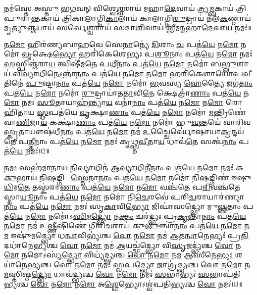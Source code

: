  
𑌨𑌮॑𑌸𑍍𑌤𑍇 𑌅𑌸𑍍𑌤𑍁 𑌭𑌗𑌵𑌨𑍍 𑌵𑌿𑌶𑍍𑌵𑍇\ul{𑌶𑍍𑌵}𑌰𑌾𑌯॑ 𑌮𑌹𑌾\ul{𑌦𑍇}𑌵𑌾𑌯॑ 𑌤𑍍𑌰𑍍𑌯\ul{𑌮𑍍𑌬}𑌕𑌾𑌯॑ 𑌤𑍍𑌰𑌿𑌪𑍁𑌰𑌾\ul{𑌨𑍍𑌤}𑌕𑌾𑌯॑ 𑌤𑍍𑌰𑌿𑌕𑌾𑌲𑌾𑌗𑍍𑌨𑌿\ul{𑌕𑌾}𑌲𑌾𑌯॑ 𑌕𑌾𑌲𑌾𑌗𑍍𑌨𑌿\ul{𑌰𑍁}𑌦𑍍𑌰𑌾𑌯॑ 𑌨𑍀𑌲\ul{𑌕}𑌣𑍍𑌠𑌾𑌯॑ 𑌮𑍃𑌤𑍍𑌯𑍁\ul{𑌞𑍍𑌜}𑌯𑌾𑌯॑ 𑌸𑌰𑍍𑌵𑍇\ul{𑌶𑍍𑌵}𑌰𑌾𑌯॑ 𑌸𑌦𑌾\ul{𑌶𑌿}𑌵𑌾𑌯॑ 𑌶𑍍𑌰𑍀𑌮𑌨𑍍𑌮𑌹𑌾\ul{𑌦𑍇}𑌵𑌾\ul{𑌯} 𑌨𑌮𑌃॑॥ 

𑌨\ul{𑌮𑍋} 𑌹𑌿𑌰॑𑌣𑍍𑌯𑌬𑌾𑌹𑌵𑍇 𑌸𑍇\ul{𑌨𑌾}𑌨𑍍𑌯𑍇॑ \ul{𑌦𑌿}𑌶𑌾𑌂 \ul{𑌚} 𑌪𑌤॑\ul{𑌯𑍇} 𑌨\ul{𑌮𑍋} 𑌨𑌮𑍋॑ \ul{𑌵𑍃}𑌕𑍍𑌷𑍇\ul{𑌭𑍍𑌯𑍋} 𑌹𑌰𑌿॑𑌕𑍇𑌶𑍇𑌭𑍍𑌯𑌃 𑌪\ul{𑌶𑍂}𑌨𑌾𑌂 𑌪𑌤॑\ul{𑌯𑍇} 𑌨\ul{𑌮𑍋} 𑌨𑌮𑌃॑ \ul{𑌸}𑌸𑍍𑌪𑌿𑌞𑍍𑌜॑𑌰𑌾\ul{𑌯} 𑌤𑍍𑌵𑌿𑌷𑍀॑𑌮𑌤𑍇 𑌪\ul{𑌥𑍀}𑌨𑌾𑌂 𑌪𑌤॑\ul{𑌯𑍇} 𑌨\ul{𑌮𑍋} 𑌨𑌮𑍋॑ 𑌬\ul{𑌭𑍍𑌲𑍁}𑌶𑌾𑌯॑ 𑌵𑌿\ul{𑌵𑍍𑌯𑌾}𑌧𑌿𑌨𑍇\-𑌽𑌨𑍍𑌨𑌾॑\ul{𑌨𑌾𑌂} 𑌪𑌤॑\ul{𑌯𑍇} 𑌨\ul{𑌮𑍋} 𑌨\ul{𑌮𑍋} 𑌹𑌰𑌿॑𑌕𑍇𑌶𑌾𑌯𑍋𑌪\ul{𑌵𑍀}𑌤𑌿𑌨𑍇॑ \ul{𑌪𑍁}𑌷𑍍𑌟𑌾\ul{𑌨𑌾𑌂} 𑌪𑌤॑\ul{𑌯𑍇} 𑌨\ul{𑌮𑍋} 𑌨𑌮𑍋॑ \ul{𑌭}𑌵𑌸𑍍𑌯॑ \ul{𑌹𑍇}𑌤𑍍𑌯𑍈 𑌜𑌗॑\ul{𑌤𑌾𑌂} 𑌪𑌤॑\ul{𑌯𑍇} 𑌨\ul{𑌮𑍋} 𑌨𑌮𑍋॑ \ul{𑌰𑍁}𑌦𑍍𑌰𑌾𑌯𑌾॑𑌤\ul{𑌤𑌾}𑌵𑌿\ul{𑌨𑍇} 𑌕𑍍𑌷𑍇𑌤𑍍𑌰𑌾॑\ul{𑌣𑌾𑌂} 𑌪𑌤॑\ul{𑌯𑍇} 𑌨\ul{𑌮𑍋} 𑌨𑌮𑌃॑ \ul{𑌸𑍂}𑌤𑌾𑌯𑌾𑌹॑𑌨𑍍𑌤𑍍𑌯𑌾\ul{𑌯} 𑌵𑌨𑌾॑\ul{𑌨𑌾𑌂} 𑌪𑌤॑\ul{𑌯𑍇} 𑌨\ul{𑌮𑍋} 𑌨\ul{𑌮𑍋} 𑌰𑍋𑌹𑌿॑𑌤𑌾𑌯 \ul{𑌸𑍍𑌥}𑌪𑌤॑𑌯𑍇 \ul{𑌵𑍃}𑌕𑍍𑌷𑌾\ul{𑌣𑌾𑌂} 𑌪𑌤॑\ul{𑌯𑍇} 𑌨\ul{𑌮𑍋} 𑌨𑌮𑍋॑ \ul{𑌮}𑌨𑍍𑌤𑍍𑌰𑌿𑌣𑍇॑ 𑌵𑌾\ul{𑌣𑌿}𑌜𑌾\ul{𑌯} 𑌕𑌕𑍍𑌷𑌾॑\ul{𑌣𑌾𑌂} 𑌪𑌤॑\ul{𑌯𑍇} 𑌨\ul{𑌮𑍋} 𑌨𑌮𑍋॑ 𑌭𑍁\ul{𑌵}𑌨𑍍𑌤𑌯𑍇॑ 𑌵𑌾𑌰𑌿𑌵\ul{𑌸𑍍𑌕𑍃}𑌤𑌾𑌯𑍗𑌷॑𑌧𑍀\ul{𑌨𑌾𑌂} 𑌪𑌤॑\ul{𑌯𑍇} 𑌨\ul{𑌮𑍋} 𑌨𑌮॑ \ul{𑌉}𑌚𑍍𑌚𑍈𑌰𑍍𑌘𑍋॑𑌷𑌾\-𑌯𑌾\ul{𑌕𑍍𑌰}𑌨𑍍𑌦𑌯॑𑌤𑍇 𑌪\ul{𑌤𑍍𑌤𑍀}𑌨𑌾𑌂 𑌪𑌤॑\ul{𑌯𑍇} 𑌨\ul{𑌮𑍋} 𑌨𑌮𑌃॑ 𑌕𑍃𑌥𑍍𑌸𑍍𑌨\ul{𑌵𑍀}𑌤𑌾\ul{𑌯} 𑌧𑌾𑌵॑\ul{𑌤𑍇} 𑌸𑌤𑍍𑌵॑\ul{𑌨𑌾𑌂} 𑌪𑌤॑\ul{𑌯𑍇} 𑌨𑌮𑌃॑॥2॥ 

𑌨\ul{𑌮𑌃} 𑌸𑌹॑𑌮𑌾𑌨𑌾𑌯 𑌨𑌿\ul{𑌵𑍍𑌯𑌾}𑌧𑌿𑌨॑ 𑌆\ul{𑌵𑍍𑌯𑌾}𑌧𑌿𑌨𑍀॑\ul{𑌨𑌾𑌂} 𑌪𑌤॑\ul{𑌯𑍇} 𑌨\ul{𑌮𑍋} 𑌨𑌮𑌃॑ 𑌕\ul{𑌕𑍁}𑌭𑌾𑌯॑ 𑌨𑌿\ul{𑌷}𑌙𑍍𑌗𑌿𑌣𑍇᳚ \ul{𑌸𑍍𑌤𑍇}𑌨𑌾\ul{𑌨𑌾𑌂} 𑌪𑌤॑\ul{𑌯𑍇} 𑌨\ul{𑌮𑍋} 𑌨𑌮𑍋॑ 𑌨𑌿\ul{𑌷}𑌙𑍍𑌗𑌿𑌣॑ 𑌇𑌷𑍁\ul{𑌧𑌿}𑌮\ul{𑌤𑍇} 𑌤𑌸𑍍𑌕॑𑌰𑌾\ul{𑌣𑌾𑌂} 𑌪𑌤॑\ul{𑌯𑍇} 𑌨\ul{𑌮𑍋} 𑌨\ul{𑌮𑍋} 𑌵𑌞𑍍𑌚॑𑌤𑍇 𑌪\ul{𑌰𑌿}𑌵𑌞𑍍𑌚॑𑌤𑍇 𑌸𑍍𑌤𑌾\ul{𑌯𑍂}𑌨𑌾𑌂 𑌪𑌤॑\ul{𑌯𑍇} 𑌨\ul{𑌮𑍋} 𑌨𑌮𑍋॑ 𑌨𑌿\ul{𑌚𑍇}𑌰𑌵𑍇॑ 𑌪𑌰𑌿\ul{𑌚}𑌰𑌾𑌯𑌾𑌰॑𑌣𑍍𑌯𑌾\ul{𑌨𑌾𑌂} 𑌪𑌤॑\ul{𑌯𑍇} 𑌨\ul{𑌮𑍋} 𑌨𑌮𑌃॑ 𑌸𑍃\ul{𑌕𑌾}𑌵𑌿\ul{𑌭𑍍𑌯𑍋} 𑌜𑌿𑌘𑌾॑𑌸𑌦𑍍𑌭𑍍𑌯𑍋 𑌮𑍁\ul{𑌷𑍍𑌣}𑌤𑌾𑌂 𑌪𑌤॑\ul{𑌯𑍇} 𑌨\ul{𑌮𑍋} 𑌨𑌮𑍋॑𑌽\ul{𑌸𑌿}𑌮\ul{𑌦𑍍𑌭𑍍𑌯𑍋} 𑌨\ul{𑌕𑍍𑌤𑌂} 𑌚𑌰॑𑌦𑍍𑌭𑍍𑌯𑌃 𑌪𑍍𑌰\ul{𑌕𑍃}𑌨𑍍𑌤𑌾\ul{𑌨𑌾𑌂} 𑌪𑌤॑\ul{𑌯𑍇} 𑌨\ul{𑌮𑍋} 𑌨𑌮॑ 𑌉\ul{𑌷𑍍𑌣𑍀}𑌷𑌿𑌣𑍇॑ 𑌗𑌿𑌰𑌿\ul{𑌚}𑌰𑌾𑌯॑ 𑌕𑍁\ul{𑌲𑍁}𑌞𑍍𑌚𑌾\ul{𑌨𑌾𑌂} 𑌪𑌤॑\ul{𑌯𑍇} 𑌨\ul{𑌮𑍋} 𑌨\ul{𑌮} 𑌇𑌷𑍁॑𑌮𑌦𑍍𑌭𑍍𑌯𑍋 𑌧\ul{𑌨𑍍𑌵𑌾}𑌵𑌿𑌭𑍍𑌯॑𑌶𑍍𑌚 \ul{𑌵𑍋} 𑌨\ul{𑌮𑍋} 𑌨𑌮॑ 𑌆𑌤\ul{𑌨𑍍𑌵𑌾}𑌨𑍇𑌭𑍍𑌯𑌃॑ 𑌪𑍍𑌰\ul{𑌤𑌿}𑌦𑌧𑌾॑𑌨𑍇𑌭𑍍𑌯𑌶𑍍𑌚 \ul{𑌵𑍋} 𑌨\ul{𑌮𑍋} 𑌨𑌮॑ \ul{𑌆}𑌯𑌚𑍍𑌛॑𑌦𑍍𑌭𑍍𑌯𑍋 𑌵𑌿\ul{𑌸𑍃}𑌜𑌦𑍍𑌭𑍍𑌯॑𑌶𑍍𑌚 \ul{𑌵𑍋} 𑌨\ul{𑌮𑍋} 𑌨𑌮𑍋𑌽𑌸𑍍𑌯॑\ul{𑌦𑍍𑌭𑍍𑌯𑍋} 𑌵𑌿𑌧𑍍𑌯॑𑌦𑍍𑌭𑍍𑌯𑌶𑍍𑌚 \ul{𑌵𑍋} 𑌨\ul{𑌮𑍋} 𑌨\ul{𑌮} 𑌆𑌸𑍀॑𑌨𑍇\ul{𑌭𑍍𑌯𑌃} 𑌶𑌯𑌾॑𑌨𑍇𑌭𑍍𑌯𑌶𑍍𑌚 \ul{𑌵𑍋} 𑌨\ul{𑌮𑍋} 𑌨𑌮𑌃॑ \ul{𑌸𑍍𑌵}𑌪\ul{𑌦𑍍𑌭𑍍𑌯𑍋} 𑌜𑌾𑌗𑍍𑌰॑𑌦𑍍𑌭𑍍𑌯𑌶𑍍𑌚 \ul{𑌵𑍋} 𑌨\ul{𑌮𑍋} 𑌨\ul{𑌮}𑌸𑍍𑌤𑌿𑌷𑍍𑌠॑\ul{𑌦𑍍𑌭𑍍𑌯𑍋} 𑌧𑌾𑌵॑𑌦𑍍𑌭𑍍𑌯𑌶𑍍𑌚 \ul{𑌵𑍋} 𑌨\ul{𑌮𑍋} 𑌨𑌮𑌃॑ \ul{𑌸}𑌭𑌾𑌭𑍍𑌯𑌃॑ \ul{𑌸}𑌭𑌾𑌪॑𑌤𑌿𑌭𑍍𑌯𑌶𑍍𑌚 \ul{𑌵𑍋} 𑌨\ul{𑌮𑍋} 𑌨\ul{𑌮𑍋} 𑌅\ul{𑌶𑍍𑌵𑍇}𑌭𑍍𑌯𑍋𑌽𑌶𑍍𑌵॑𑌪𑌤𑌿𑌭𑍍𑌯𑌶𑍍𑌚 \ul{𑌵𑍋} 𑌨𑌮𑌃॑॥3॥ 

